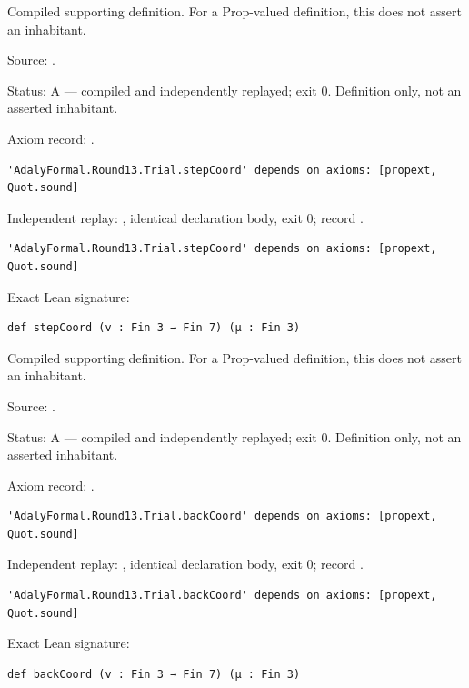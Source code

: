 \begin{definition}[bp-376]
\label{bp-376}
\uses{}
\leanok
Compiled supporting definition. For a Prop-valued definition, this does not assert an inhabitant.

\par Source: \texttt{}.
\par Status: A — compiled and independently replayed; exit 0. Definition only, not an asserted inhabitant.
\par Axiom record: \texttt{}.
\begin{verbatim}
'AdalyFormal.Round13.Trial.stepCoord' depends on axioms: [propext, Quot.sound]
\end{verbatim}
\par Independent replay: \texttt{}, identical declaration body, exit 0; record \texttt{}.
\begin{verbatim}
'AdalyFormal.Round13.Trial.stepCoord' depends on axioms: [propext, Quot.sound]
\end{verbatim}
\par Exact Lean signature:
\begin{verbatim}
def stepCoord (v : Fin 3 → Fin 7) (μ : Fin 3)
\end{verbatim}
\end{definition}

\begin{definition}[bp-377]
\label{bp-377}
\uses{}
\leanok
Compiled supporting definition. For a Prop-valued definition, this does not assert an inhabitant.

\par Source: \texttt{}.
\par Status: A — compiled and independently replayed; exit 0. Definition only, not an asserted inhabitant.
\par Axiom record: \texttt{}.
\begin{verbatim}
'AdalyFormal.Round13.Trial.backCoord' depends on axioms: [propext, Quot.sound]
\end{verbatim}
\par Independent replay: \texttt{}, identical declaration body, exit 0; record \texttt{}.
\begin{verbatim}
'AdalyFormal.Round13.Trial.backCoord' depends on axioms: [propext, Quot.sound]
\end{verbatim}
\par Exact Lean signature:
\begin{verbatim}
def backCoord (v : Fin 3 → Fin 7) (μ : Fin 3)
\end{verbatim}
\end{definition}

